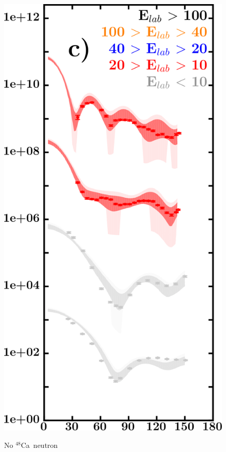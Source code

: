 \documentclass[twocolumn,secnumarabic,amssymb, nobibnotes, aps, prl,
superscriptaddress, nobalancelastpage, draft]{revtex4}
\newcommand{\caEight}{\ensuremath{^{48}}C\lowercase{a}}
\begin{document}
\begin{figure}[!htb]
\begin{minipage}{0.4\linewidth}
\begin{minipage}[c]{0.5\linewidth}
                \includegraphics[width=\linewidth]{figures/ca48_neutronElastic.png}
        \end{minipage}
        \begin{minipage}[c]{0.45\linewidth}
            \centering
            No \caEight\ neutron \\

\end{minipage}
\end{minipage}
\end{figure}
\end{document}

